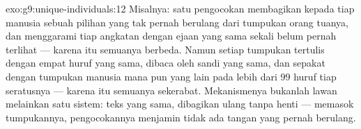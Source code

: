 \begin{solution}{exo:g9:unique-individuals:12}
Misalnya: satu pengocokan membagikan kepada tiap manusia
sebuah pilihan yang tak pernah berulang dari tumpukan orang
tuanya, dan  menggarami tiap angkatan dengan ejaan
yang sama sekali belum pernah terlihat --- karena itu
semuanya berbeda. Namun setiap tumpukan tertulis dengan
empat huruf yang sama, dibaca oleh sandi yang sama, dan
sepakat dengan tumpukan manusia mana pun yang lain pada
lebih dari $99$ huruf tiap seratusnya --- karena itu semuanya
sekerabat. Mekanismenya bukanlah lawan melainkan satu
sistem: teks yang sama, dibagikan ulang tanpa henti ---
 memasok tumpukannya, pengocokannya menjamin
tidak ada tangan yang pernah berulang.
\end{solution}

